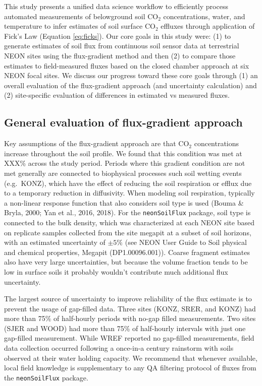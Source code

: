\documentclass[
  letterpaper,
  DIV=11,
  numbers=noendperiod]{scrartcl}
\begin{document}
This study presents a unified data science workflow to efficiently
process automated measurements of belowground soil CO\(_{2}\)
concentrations, water, and temperature to infer estimates of soil
surface CO\(_{2}\) effluxes through application of Fick's Law (Equation
\ref{eq:ficks}). Our core goals in this study were: (1) to generate
estimates of soil flux from continuous soil sensor data at terrestrial
NEON sites using the flux-gradient method and then (2) to compare those
estimates to field-measured fluxes based on the closed chamber approach
at six NEON focal sites. We discuss our progress toward these core goals
through (1) an overall evaluation of the flux-gradient approach (and
uncertainty calculation) and (2) site-specific evaluation of differences
in estimated vs measured fluxes.

\subsection{General evaluation of flux-gradient
approach}\label{general-evaluation-of-flux-gradient-approach}

Key assumptions of the flux-gradient approach are that CO\(_{2}\)
concentrations increase throughout the soil profile. We found that this
condition was met at XXX\% across the study period. Periods where this
gradient condition are not met generally are connected to biophysical
processes such soil wetting events (e.g.~KONZ), which have the effect of
reducing the soil respiration or efflux due to a temporary reduction in
diffusivity. When modeling soil respiration, typically a non-linear
response function that also considers soil type is used (Bouma \& Bryla,
2000; Yan et al., 2016, 2018). For the \texttt{neonSoilFlux} package,
soil type is connected to the bulk density, which was characterized at
each NEON site based on replicate samples collected from the site
megapit at a subset of soil horizons, with an estimated uncertainty of
\(\pm5\%\) (see NEON User Guide to Soil physical and chemical
properties, Megapit (DP1.00096.001)). Coarse fragment estimates also
have very large uncertainties, but because the volume fraction tends to
be low in surface soils it probably wouldn't contribute much additional
flux uncertainty.

The largest source of uncertainty to improve reliability of the flux
estimate is to prevent the usage of gap-filled data. Three sites (KONZ,
SRER, and KONZ) had more than 75\% of half-hourly periods with no-gap
filled measurements. Two sites (SJER and WOOD) had more than 75\% of
half-hourly intervals with just one gap-filled measurement. While WREF
reported no gap-filled measurements, field data collection occurred
following a once-in-a century rainstorm with soils observed at their
water holding capacity. We recommend that whenever available, local
field knowledge is supplementary to any QA filtering protocol of fluxes
from the \texttt{neonSoilFlux} package.
\end{document}
